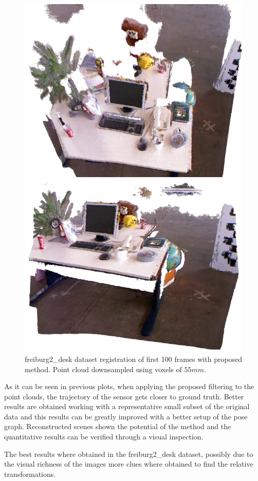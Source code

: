 \begin{figure}[H]
\begin{center}
\includegraphics[scale=0.27]{images/freiburg2_desk.png}
\caption{freiburg2\_desk dataset registration of first 100 frames with proposed method. Point cloud downsampled using voxels of $55mm$.}
\label{fig:jan}
\end{center}
\end{figure}


As it can be seen in previous plots, when applying the proposed filtering to the point clouds, the trajectory of the sensor gets 
closer to ground truth. Better results are obtained working with a representative small subset of the original data and this results 
can be greatly improved with a better setup of the pose graph. Reconstructed scenes shown the potential of the method and the quantitative 
results can be verified through a visual inspection. 

The best results where obtained in the freiburg2\_desk dataset, possibly due to the visual richness of the images more clues where obtained 
to find the relative transformations.
